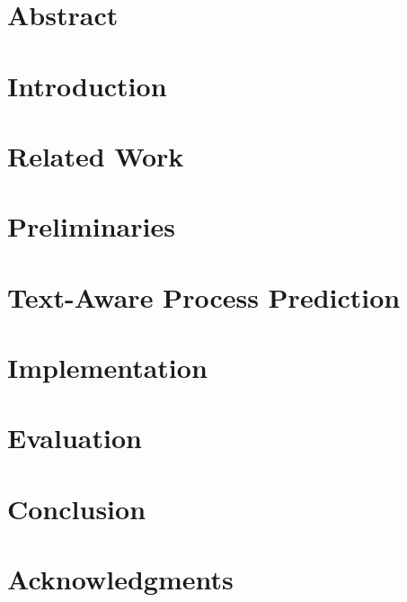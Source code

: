 \documentclass[a4paper,11pt,twoside]{pads-thesis}
\begin{document}

\gTitlePage

\chapter*{Abstract} 


\tableofcontents

\cleardoublepage
\pagestyle{fancy}

\chapter{Introduction} \label{chap:intro}


\chapter{Related Work} \label{chap:related_work}


\chapter{Preliminaries} \label{chap:prelim}


\chapter{Text-Aware Process Prediction} \label{chap:concept}


\chapter{Implementation} \label{chap:impl}


\chapter{Evaluation} \label{chap:eval}


\chapter{Conclusion} \label{chap:conclusion}



\chapter*{Acknowledgments}


\end{document}
